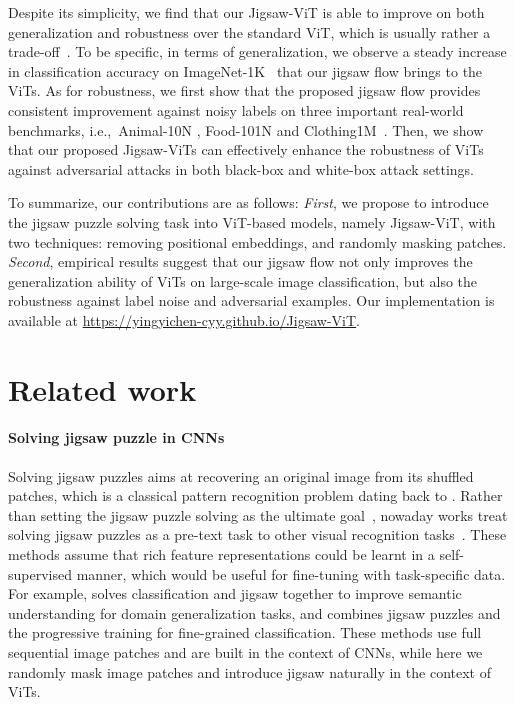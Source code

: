 \documentclass{article}
\begin{document}
Despite its simplicity, we find that our Jigsaw-ViT is able to improve on both generalization and robustness over the standard ViT, which is usually rather a trade-off~\cite{zhang2019theoretically}. 
To be specific, in terms of generalization, we observe a steady increase in classification accuracy on ImageNet{-1K}~\cite{deng2009imagenet} that our jigsaw flow brings to the ViTs.
As for robustness, we first show that the proposed jigsaw flow provides consistent improvement against noisy labels on three important real-world benchmarks, i.e.,~Animal-10N \cite{song2019selfie}, Food-101N \cite{lee2018cleannet} and Clothing1M~\cite{xiao2015learning}.
Then, we show that our proposed Jigsaw-ViTs can effectively enhance the robustness of ViTs against adversarial attacks in both black-box and white-box attack settings.

To summarize, our contributions are as follows: \textit{First}, we propose to introduce the jigsaw puzzle solving task into ViT-based models, namely Jigsaw-ViT, with two techniques: removing positional embeddings, and randomly masking patches.
\textit{Second}, empirical results suggest that our jigsaw flow not only improves the generalization ability of ViTs on large-scale image classification, but also the robustness against label noise and adversarial examples.
Our implementation is available at \url{https://yingyichen-cyy.github.io/Jigsaw-ViT}.

\section{Related work}
\label{sec:related_work}
\paragraph{Solving jigsaw puzzle in CNNs}
Solving jigsaw puzzles aims at recovering an original image from its shuffled patches, which is a classical pattern recognition problem dating back to \cite{freeman1964apictorial}.
Rather than setting the jigsaw puzzle solving as the ultimate goal~\cite{gallagher2012jigsaw}, nowaday works treat solving jigsaw puzzles as a pre-text task to other visual recognition tasks~\cite{carlucci2019domain,du2020fine}.
These methods assume that rich feature representations could be learnt in a self-supervised manner, which would be useful for fine-tuning with task-specific data.
For example, \cite{carlucci2019domain} solves classification and jigsaw together to improve semantic understanding for domain generalization tasks, and \cite{du2020fine} combines jigsaw puzzles and the progressive training for fine-grained classification.
These methods use full sequential image patches and are built in the context of CNNs, while here we randomly mask image patches and introduce jigsaw naturally in the context of ViTs.
\end{document}
